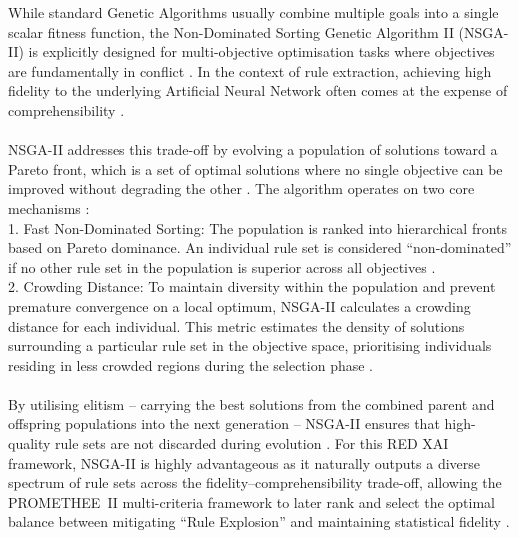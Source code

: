 While standard Genetic Algorithms usually combine multiple goals into a single scalar fitness function,
the Non-Dominated Sorting Genetic Algorithm II (NSGA-II) is explicitly designed for multi-objective
optimisation tasks where objectives are fundamentally in conflict \cite{Deb2002}. In the context
of rule extraction, achieving high fidelity to the underlying Artificial Neural Network often comes
at the expense of comprehensibility \cite{Yedjour2024}.
\\\\
NSGA-II addresses this trade-off by evolving a population of solutions toward a Pareto front, which
is a set of optimal solutions where no single objective can be improved without degrading the other
\cite{Deb2002}. The algorithm operates on two core mechanisms \cite{Deb2002}:
\\
1. Fast Non-Dominated Sorting: The population is ranked into hierarchical fronts based on
Pareto dominance. An individual rule set is considered ``non-dominated'' if no other rule set in the
population is superior across all objectives \cite{Deb2002}.
\\
2. Crowding Distance: To maintain diversity within the population and prevent premature
convergence on a local optimum, NSGA-II calculates a crowding distance for each individual. This
metric estimates the density of solutions surrounding a particular rule set in the objective space,
prioritising individuals residing in less crowded regions during the selection phase \cite{Deb2002}.
\\\\
By utilising elitism -- carrying the best solutions from the combined parent and offspring populations
into the next generation -- NSGA-II ensures that high-quality rule sets are not discarded during
evolution \cite{Deb2002, Yedjour2024}. For this RED XAI framework, NSGA-II is highly advantageous
as it naturally outputs a diverse spectrum of rule sets across the fidelity--comprehensibility trade-off,
allowing the PROMETHEE~II multi-criteria framework to later rank and select the optimal balance between
mitigating ``Rule Explosion'' and maintaining statistical fidelity \cite{Yedjour2024, Brans1985}.
